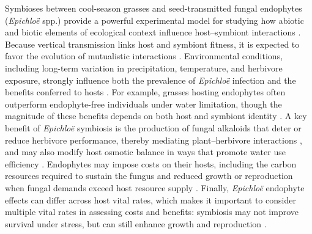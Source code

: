 \documentclass[12pt]{article}\usepackage[]{graphicx}\usepackage[dvipsnames]{xcolor}
\newcommand{\tom}[2]{{\color{red}{#1}}\footnote{\textit{\color{red}{#2}}}}
\begin{document}
Symbioses between cool-season grasses and seed-transmitted fungal endophytes (\textit{Epichloë} spp.) provide a powerful experimental model for studying how abiotic and biotic elements of ecological context influence host–symbiont interactions \citep{schardl2004symbioses,saikkonen2010defensive,oberhofer2014effects,clay2005herbivores}. 
Because vertical transmission links host and symbiont fitness, it is expected to favor the evolution of mutualistic interactions \citep{gundel2024temporal,gundel2011incorporating}. 
Environmental conditions, including long-term variation in precipitation, temperature, and herbivore exposure, strongly influence both the prevalence of \textit{Epichloë} infection and the benefits conferred to hosts \citep{rudgers2016long,fowler2025increasing}. 
For example, grasses hosting endophytes often outperform endophyte-free individuals under water limitation, though the magnitude of these benefits depends on both host and symbiont identity \citep{decunta2021systematic}. 
A key benefit of \textit{Epichloë}  symbiosis is the production of fungal alkaloids that deter or reduce herbivore performance, thereby mediating plant–herbivore interactions \citep{clay2005herbivores,saikkonen2010defensive}, and may also modify host osmotic balance in ways that promote water use efficiency \citep{decunta2021systematic}. 
Endophytes may impose costs on their hosts, including the carbon resources required to sustain the fungus and reduced growth or reproduction when 
fungal demands exceed host resource supply \citep{yule2013costs}.
Finally, \textit{Epichloë} endophyte effects can differ across host vital rates, which makes it important to consider multiple vital rates in assessing costs and benefits: symbiosis may not improve survival under stress, but can still enhance growth and reproduction \citep{yule2013costs,rudgers2012there}. 
\end{document}
